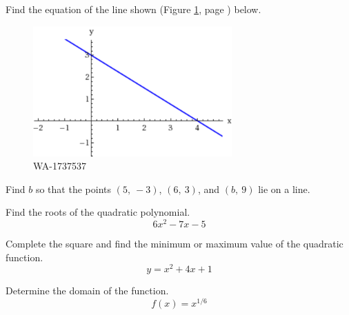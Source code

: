 \documentclass[12pt,addpoints, answers, fleqn]{exam}
\begin{document}
\begin{teacher}
\begin{questions}
\question 	%

Find the equation of the line shown (Figure \ref{fig:1737537}, page \pageref{fig:1737537}) below. 
\begin{figure}[htbp] %
   \centering
   \includegraphics[width=3in]{./graphics/1737537.pdf} 
   \caption{WA-1737537}
   \label{fig:1737537}
\end{figure}

\begin{solution}
\end{solution}

\question 	%
Find $b$ so that the points $\left(5, \ -3\right)$, $\left(6, \ 3 \right)$, and $\left(b, \ 9 \right)$ lie on a line.

\begin{solution}
\end{solution}

\question 	%

Find the roots of the quadratic polynomial.
\[
6x^2 - 7x - 5
\]

\begin{solution}
\end{solution}

\question 	%

Complete the square and find the minimum or maximum value of the quadratic function.
\[
y = x^2 + 4x + 1
\]

\begin{solution}
\end{solution}

\question 	%

Determine the domain of the function.
\[
f\left(x\right) = x^{1/6}
\]

\begin{solution}
\end{solution}

\question 	%


\end{questions}
\end{teacher}
\end{document}
